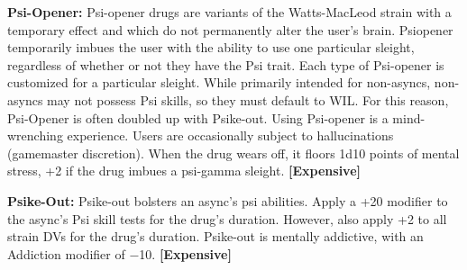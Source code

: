 \textbf{Psi-Opener:} Psi-opener drugs are variants of the Watts-MacLeod strain with a temporary effect and which do not permanently alter the user’s brain. Psiopener temporarily imbues the user with the ability to use one particular sleight, regardless of whether or not they have the Psi trait. Each type of Psi-opener is customized for a particular sleight. While primarily intended for non-asyncs, non-asyncs may not possess Psi skills, so they must default to WIL. For this reason, Psi-Opener is often doubled up with Psike-out. Using Psi-opener is a mind-wrenching experience. Users are occasionally subject to hallucinations (gamemaster discretion). When the drug wears off, it floors 1d10 points of mental stress, +2 if the drug imbues a psi-gamma sleight. \textbf{[Expensive]}

\textbf{Psike-Out:} Psike-out bolsters an async’s psi abilities. Apply a +20 modifier to the async’s Psi skill tests for the drug’s duration. However, also apply +2 to all strain DVs for the drug’s duration. Psike-out is mentally addictive, with an Addiction modifier of $-$10. \textbf{[Expensive]}

